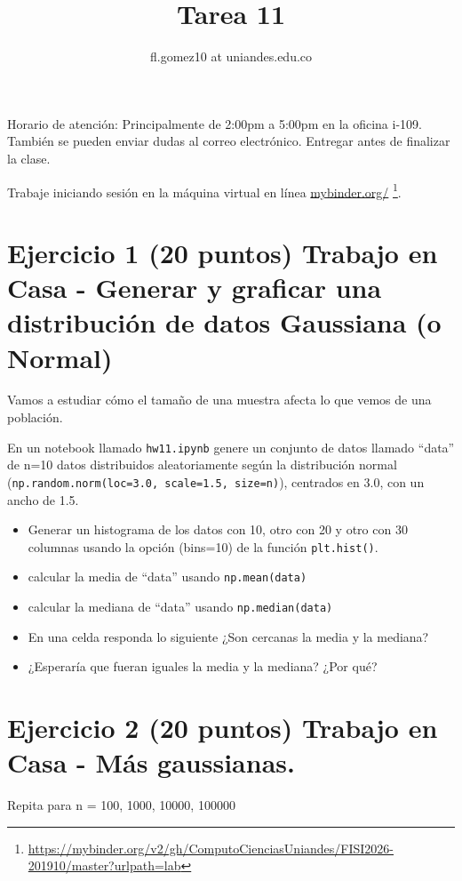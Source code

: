 \documentclass{article}
\title{Tarea 11}
\author{fl.gomez10 at uniandes.edu.co}
\begin{document}
\maketitle

Horario de atención: Principalmente de 2:00pm a 5:00pm en la oficina i-109.
También se pueden enviar dudas al correo electrónico.
Entregar antes de finalizar la clase. 

Trabaje iniciando  sesión en la máquina virtual en línea
\href{https://mybinder.org/v2/gh/ComputoCienciasUniandes/FISI2026-201910/master?urlpath=lab}{mybinder.org/}
\footnote{\url{https://mybinder.org/v2/gh/ComputoCienciasUniandes/FISI2026-201910/master?urlpath=lab}}. 


\section{Ejercicio 1 (20 puntos) Trabajo en Casa - Generar y graficar una distribución de datos Gaussiana (o Normal)}

Vamos a estudiar cómo el tamaño de una muestra afecta lo que vemos de una población.

En un notebook llamado \texttt{hw11.ipynb} genere un conjunto de datos
llamado ``data'' de n=10 datos distribuidos aleatoriamente según
la distribución normal (\texttt{np.random.norm(loc=3.0, scale=1.5, size=n)}),
centrados en 3.0, con un ancho de 1.5.

\begin{itemize}
\item Generar un histograma de los datos con 10, otro con 20
  y otro con 30 columnas usando la opción (bins=10) de la
  función \texttt{plt.hist()}.
\item calcular la media de ``data'' usando \texttt{np.mean(data)}
\item calcular la mediana de ``data'' usando \texttt{np.median(data)}
\item En una celda responda lo siguiente ¿Son cercanas la media y la mediana?
\item ¿Esperaría que fueran iguales la media y la mediana? ¿Por qué?
\end{itemize}

\section{Ejercicio 2 (20 puntos) Trabajo en Casa - Más gaussianas.}

Repita para n = {100, 1000, 10000, 100000}
\end{document}
